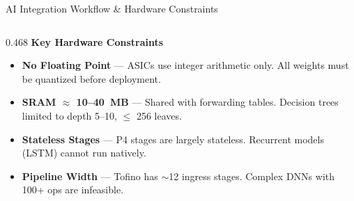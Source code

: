 {\begin{frame}{AI Integration Workflow \& Hardware Constraints}
\begin{columns}[T, totalwidth=\textwidth]
    \begin{column}{0.468\textwidth}
      {\color{problemorange}\bfseries\small Key Hardware Constraints}
      \vspace{6pt}
      \begin{itemize}
        \setlength\itemsep{8pt}
        \footnotesize
        \item[\textcolor{problemorange}{\bfseries C1}]
          \textbf{No Floating Point} ---
          ASICs use integer arithmetic only.
          All weights must be quantized
          before deployment.
        \item[\textcolor{problemorange}{\bfseries C2}]
          \textbf{SRAM $\approx$ 10--40~MB} ---
          Shared with forwarding tables.
          Decision trees limited to
          depth 5--10, $\leq$ 256 leaves.
        \item[\textcolor{problemorange}{\bfseries C3}]
          \textbf{Stateless Stages} ---
          P4 stages are largely stateless.
          Recurrent models (LSTM) cannot
          run natively.
        \item[\textcolor{problemorange}{\bfseries C4}]
          \textbf{Pipeline Width} ---
          Tofino has $\sim$12 ingress stages.
          Complex DNNs with 100+ ops
          are infeasible.
      \end{itemize}
    \end{column}

  \end{columns}

\end{frame}
}